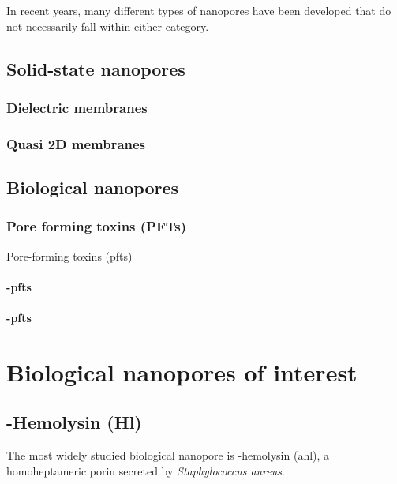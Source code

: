 In recent years, many different types of nanopores have been developed that do not necessarily fall within either category. 

\subsection{Solid-state nanopores}

\subsubsection{Dielectric membranes}

\subsubsection{Quasi 2D membranes}

\subsection{Biological nanopores}

\subsubsection{Pore forming toxins (PFTs)}

Pore-forming toxins (\glspl{pft})

\paragraph{\ta-\glspl{pft}}

\paragraph{\tb-\glspl{pft}}


%
%
\section{Biological nanopores of interest}


\subsection{\ta-Hemolysin (\ta Hl)}

The most widely studied biological nanopore is \textalpha-hemolysin (\gls{ahl}), a homoheptameric porin
secreted by \textit{Staphylococcus aureus}.

